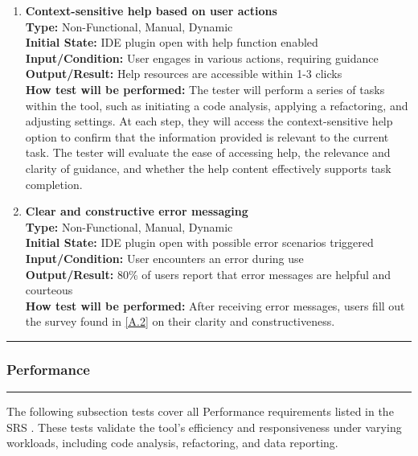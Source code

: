 \documentclass[12pt, titlepage]{article}
\newcommand{\colorrule}{\textcolor{BlueViolet}{\rule{\linewidth}{2pt}}}
\begin{document}
\begin{enumerate}[label={\bf \textcolor{Maroon}{test-UH-\arabic*}}, wide=0pt, font=\itshape]
  \item \textbf{Context-sensitive help based on user actions} \\[2mm]
    \textbf{Type:} Non-Functional, Manual, Dynamic \\
    \textbf{Initial State:} IDE plugin open with help function enabled \\
    \textbf{Input/Condition:} User engages in various actions, requiring guidance \\
    \textbf{Output/Result:} Help resources are accessible within 1-3 clicks \\[2mm]
    \textbf{How test will be performed:} The tester will perform a series of tasks within the tool, such as initiating a code analysis, applying a refactoring, and adjusting settings. At each step, they will access the context-sensitive help option to confirm that the information provided is relevant to the current task. The tester will evaluate the ease of accessing help, the relevance and clarity of guidance, and whether the help content effectively supports task completion.

  \item \textbf{Clear and constructive error messaging} \\[2mm]
    \textbf{Type:} Non-Functional, Manual, Dynamic \\
    \textbf{Initial State:} IDE plugin open with possible error scenarios triggered \\
    \textbf{Input/Condition:} User encounters an error during use \\
    \textbf{Output/Result:} 80\% of users report that error messages are helpful and courteous \\[2mm]
    \textbf{How test will be performed:} After receiving error messages, users fill out the survey found in \ref{A.2} on their clarity and constructiveness.
\end{enumerate}

\noindent
\textcolor{Blue}{\colorrule}

\subsubsection{Performance}
\colorrule

\medskip

\noindent
The following subsection tests cover all Performance requirements listed in the SRS \cite{SRS}. These tests validate the tool’s efficiency and responsiveness under varying workloads, including code analysis, refactoring, and data reporting.
\end{document}
